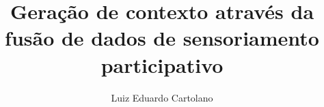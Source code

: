 \author{Luiz Eduardo Cartolano}
\title{Geração de contexto através da fusão de dados de sensoriamento participativo}
\newcommand{\nomedocurso}{MC040 - Iniciação Científica}
\newcommand{\orientador}{Prof. Dr. Leandro Villas}
